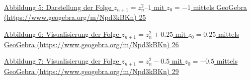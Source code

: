 \documentclass[a4paper, 12pt]{book}
\begin{document}
\protect\hyperlink{_Toc167901655}{Abbildung 5: Darstellung der Folge
\(z_{n + 1} = z_{n}^{2}–1\) mit \({z}_{0} =  - 1\) mittels
GeoGebra (https://www.geogebra.org/m/Npd3kBKn)
\protect\hyperlink{_Toc167901655}{25}}

\protect\hyperlink{_Toc167901656}{Abbildung 6: Visualisierung der Folge
\(z_{n + 1} = z_{n}^{2} + 0.25\) mit \(z_{0} = 0.25\)
mittels GeoGebra (https://www.geogebra.org/m/Npd3kBKn)
\protect\hyperlink{_Toc167901656}{26}}

\protect\hyperlink{_Toc167901657}{Abbildung 7: Visualisierung der Folge
\(z_{n + 1} = z_{n}^{2} - 0.5\) mit \(z_{0} =  - 0.5\)
mittels GeoGebra (https://www.geogebra.org/m/Npd3kBKn)
\protect\hyperlink{_Toc167901657}{29}}
\end{document}
